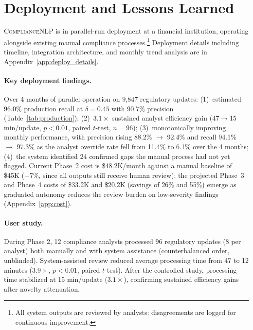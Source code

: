 \documentclass[11pt]{article}
\begin{document}
\section{Deployment and Lessons Learned}
\label{sec:deployment}

\textsc{ComplianceNLP} is in parallel-run deployment at a financial institution, operating alongside existing manual compliance processes.\footnote{All system outputs are reviewed by analysts; disagreements are logged for continuous improvement.} Deployment details including timeline, integration architecture, and monthly trend analysis are in Appendix~\ref{app:deploy_details}.

\paragraph{Key deployment findings.} Over 4 months of parallel operation on 9{,}847 regulatory updates: (1)~estimated 96.0\% production recall at $\delta{=}0.45$ with 90.7\% precision (Table~\ref{tab:production}); (2)~$3.1\times$ sustained analyst efficiency gain (47$\to$15 min/update, $p{<}0.01$, paired $t$-test, $n{=}96$); (3)~monotonically improving monthly performance, with precision rising 88.2\% $\to$ 92.4\% and recall 94.1\% $\to$ 97.3\% as the analyst override rate fell from 11.4\% to 6.1\% over the 4 months; (4)~the system identified 24 confirmed gaps the manual process had not yet flagged. Current Phase~2 cost is \$48.2K/month against a manual baseline of \$45K (+7\%, since all outputs still receive human review); the projected Phase~3 and Phase~4 costs of \$33.2K and \$20.2K (savings of 26\% and 55\%) emerge as graduated autonomy reduces the review burden on low-severity findings (Appendix~\ref{app:cost}).

\paragraph{User study.} During Phase 2, 12 compliance analysts processed 96 regulatory updates (8 per analyst) both manually and with system assistance (counterbalanced order, unblinded). System-assisted review reduced average processing time from 47 to 12 minutes ($3.9\times$, $p{<}0.01$, paired $t$-test). After the controlled study, processing time stabilized at 15 min/update ($3.1\times$), confirming sustained efficiency gains after novelty attenuation.
\end{document}
